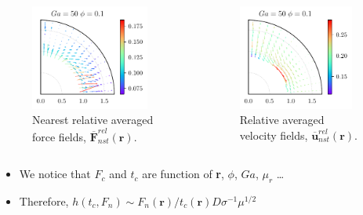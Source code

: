 \documentclass{sintefbeamer}
\newcommand{\nstrelavg}[1]{\overline{#1}_{nst}^{rel}}
\begin{document}
\begin{frame}
\begin{columns}
\begin{columns}
\begin{figure}
        \includegraphics[width=0.9\textwidth]{image/HOMOGENEOUS/fDrop/F_mu_r_0_1_Ga_50_PHI_0_1.pdf}
        \caption{Nearest relative averaged force fields, $\nstrelavg{\textbf{F}}(\textbf{r})$.}
      \end{figure}
      \centering
      \begin{figure}
      \includegraphics[width=0.9\textwidth]{image/HOMOGENEOUS/fDrop/U_mu_r_0_1_Ga_50_PHI_0_1.pdf}
      \caption{Relative averaged velocity fields, $\nstrelavg{\textbf{u}}(\textbf{r})$.}
    \end{figure}
    \end{columns}
  \end{columns}
  \begin{itemize}
    \item We notice that $F_c$ and $t_c$ are function of \textbf{r}, $\phi$, $Ga$, $\mu_r$ \ldots
    \item Therefore,
    $ h(t_c,F_n)  \sim F_n(\textbf{r}) / t_c(\textbf{r}) D \sigma^{-1} \mu^{1/2}$
  \end{itemize}
\end{frame}
\end{document}
